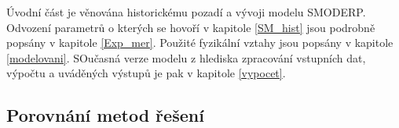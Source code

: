 %

Úvodní část je věnována historickému pozadí a vývoji modelu SMODERP. Odvození parametrů o kterých se hovoří v kapitole \ref{SM_hist} jsou podrobně popsány v kapitole \ref{Exp_mer}. Použité fyzikální vztahy jsou popsány v kapitole \ref{modelovani}. SOučasná verze modelu z hlediska zpracování vstupních dat, výpočtu a uváděných výstupů je pak v kapitole \ref{vypocet}.

\subsection{Porovnání metod řešení} \label{porovnani1D2D}


